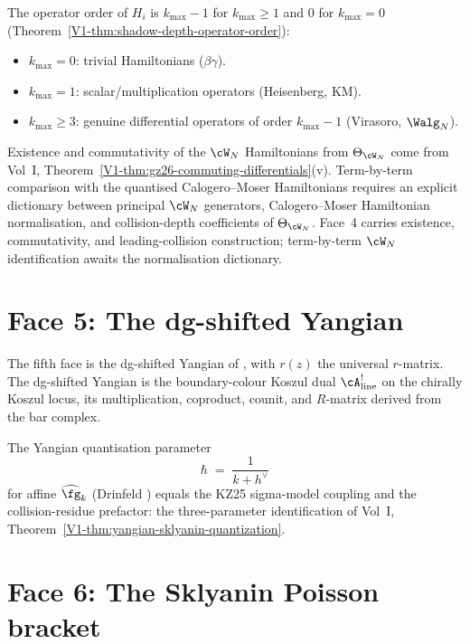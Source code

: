 The operator order of $H_i$ is $k_{\max}-1$ for $k_{\max}\geq 1$
and $0$ for $k_{\max}=0$
(Theorem~\ref{V1-thm:shadow-depth-operator-order}):
\begin{itemize}
\item $k_{\max}=0$: trivial Hamiltonians ($\beta\gamma$).
\item $k_{\max}=1$: scalar/multiplication operators (Heisenberg, KM).
\item $k_{\max}\geq 3$: genuine differential operators of order $k_{\max}-1$ (Virasoro, $\Walg_N$).
\end{itemize}

\begin{remark}
\label{rem:vol2-gz26-wn-normalization}
Existence and commutativity of the $\cW_N$ Hamiltonians from
$\Theta_{\cW_N}$ come from Vol~I,
Theorem~\ref{V1-thm:gz26-commuting-differentials}(v). Term-by-term
comparison with the quantised Calogero--Moser Hamiltonians requires an explicit
dictionary between principal $\cW_N$ generators, Calogero--Moser
Hamiltonian normalisation, and collision-depth coefficients of
$\Theta_{\cW_N}$. Face~4 carries existence, commutativity, and
leading-collision construction; term-by-term $\cW_N$ identification
awaits the normalisation dictionary.
\end{remark}

\section{Face 5: The dg-shifted Yangian}
\label{sec:face-5-dg-shifted-yangian}

The fifth face is the dg-shifted Yangian of \cite{DNP25}, with
$r(z)$ the universal $r$-matrix. The dg-shifted Yangian is the
boundary-colour Koszul dual $\cA^!_{\mathrm{line}}$ on the
chirally Koszul locus, its multiplication, coproduct, counit, and
$R$-matrix derived from the bar complex.

The Yangian quantisation parameter
\[
\hbar
\;=\;
\frac{1}{k+h^\vee}
\]
for affine $\widehat{\fg}_k$ (Drinfeld \cite{Drinfeld85}) equals
the KZ25 sigma-model coupling and the collision-residue prefactor:
the three-parameter identification of Vol~I,
Theorem~\ref{V1-thm:yangian-sklyanin-quantization}.

\section{Face 6: The Sklyanin Poisson bracket}
\label{sec:face-6-sklyanin}

